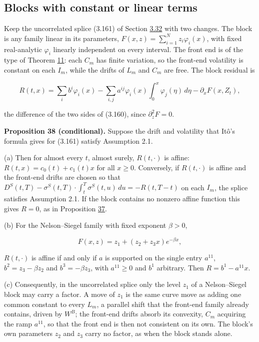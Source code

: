 \documentclass[11pt]{article}
\begin{document}
\subsection{Blocks with constant or linear terms}\label{sec:3.33}

Keep the uncorrelated splice (3.161) of Section \hyperref[sec:3.32]{3.32} with two changes. The block is any family linear in its parameters, \(F(x,z)=\sum_{i=1}^Nz_i\varphi_i(x)\), with fixed real-analytic \(\varphi_i\) linearly independent on every interval. The front end is of the type of Theorem \hyperref[res:Theorem-11]{11}: each \(C_m\) has finite variation, so the front-end volatility is constant on each \(I_m\), while the drifts of \(L_m\) and \(C_m\) are free. The block residual is

\begin{equation*}
R(t,x)=\sum_ib^i\varphi_i(x)-\sum_{i,j}a^{ij}\varphi_i(x)\int_0^x\varphi_j(\eta)\,d\eta-\partial_xF(x,Z_t), \tag{3.162}\label{eq:3.162}
\end{equation*}

the difference of the two sides of (3.160), since \(\partial^2_zF=0\).

\label{res:Proposition-38}
\textbf{Proposition 38 (conditional).} Suppose the drift and volatility that Itô's formula gives for (3.161) satisfy Assumption 2.1.

(a) Then for almost every \(t\), almost surely, \(R(t,\cdot)\) is affine: \(R(t,x)=c_0(t)+c_1(t)x\) for all \(x\ge0\). Conversely, if \(R(t,\cdot)\) is affine and the front-end drifts are chosen so that \(D^S(t,T)-\sigma^S(t,T)\cdot\int_t^T\sigma^S(t,u)\,du=-R(t,T-t)\) on each \(I_m\), the splice satisfies Assumption 2.1. If the block contains no nonzero affine function this gives \(R=0\), as in Proposition \hyperref[res:Proposition-37]{37}.

(b) For the Nelson--Siegel family with fixed exponent \(\beta>0\),

\begin{equation*}
F(x,z)=z_1+(z_2+z_3x)e^{-\beta x}, \tag{3.163}\label{eq:3.163}
\end{equation*}

\(R(t,\cdot)\) is affine if and only if \(a\) is supported on the single entry \(a^{11}\), \(b^2=z_3-\beta z_2\) and \(b^3=-\beta z_3\), with \(a^{11}\ge0\) and \(b^1\) arbitrary. Then \(R=b^1-a^{11}x\).

(c) Consequently, in the uncorrelated splice only the level \(z_1\) of a Nelson--Siegel block may carry a factor. A move of \(z_1\) is the same curve move as adding one common constant to every \(L_m\), a parallel shift that the front-end family already contains, driven by \(W^B\); the front-end drifts absorb its convexity, \(C_m\) acquiring the ramp \(a^{11}\), so that the front end is then not consistent on its own. The block's own parameters \(z_2\) and \(z_3\) carry no factor, as when the block stands alone.
\end{document}
